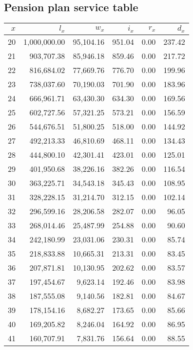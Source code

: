 \documentclass[12pt]{article}
\begin{document}
\subsection{Pension plan service table}

\begin{longtable}{rrrrrr}
  \hline
$x$ & $l_x$ & $w_x$ & $i_x$ & $r_x$ & $d_x$ \\ 
  \hline \endhead 20 & 1,000,000.00 & 95,104.16 & 951.04 & 0.00 & 237.42 \\ 
  21 & 903,707.38 & 85,946.18 & 859.46 & 0.00 & 217.72 \\ 
  22 & 816,684.02 & 77,669.76 & 776.70 & 0.00 & 199.96 \\ 
  23 & 738,037.60 & 70,190.03 & 701.90 & 0.00 & 183.96 \\ 
  24 & 666,961.71 & 63,430.30 & 634.30 & 0.00 & 169.56 \\ 
  25 & 602,727.56 & 57,321.25 & 573.21 & 0.00 & 156.59 \\ 
  26 & 544,676.51 & 51,800.25 & 518.00 & 0.00 & 144.92 \\ 
  27 & 492,213.33 & 46,810.69 & 468.11 & 0.00 & 134.43 \\ 
  28 & 444,800.10 & 42,301.41 & 423.01 & 0.00 & 125.01 \\ 
  29 & 401,950.68 & 38,226.16 & 382.26 & 0.00 & 116.54 \\ 
  30 & 363,225.71 & 34,543.18 & 345.43 & 0.00 & 108.95 \\ 
  31 & 328,228.15 & 31,214.70 & 312.15 & 0.00 & 102.14 \\ 
  32 & 296,599.16 & 28,206.58 & 282.07 & 0.00 & 96.05 \\ 
  33 & 268,014.46 & 25,487.99 & 254.88 & 0.00 & 90.60 \\ 
  34 & 242,180.99 & 23,031.06 & 230.31 & 0.00 & 85.74 \\ 
  35 & 218,833.88 & 10,665.31 & 213.31 & 0.00 & 83.45 \\ 
  36 & 207,871.81 & 10,130.95 & 202.62 & 0.00 & 83.57 \\ 
  37 & 197,454.67 & 9,623.14 & 192.46 & 0.00 & 83.98 \\ 
  38 & 187,555.08 & 9,140.56 & 182.81 & 0.00 & 84.67 \\ 
  39 & 178,154.16 & 8,682.27 & 173.65 & 0.00 & 85.66 \\ 
  40 & 169,205.82 & 8,246.04 & 164.92 & 0.00 & 86.95 \\ 
  41 & 160,707.91 & 7,831.76 & 156.64 & 0.00 & 88.55 \\ 

\end{longtable}
\end{document}
